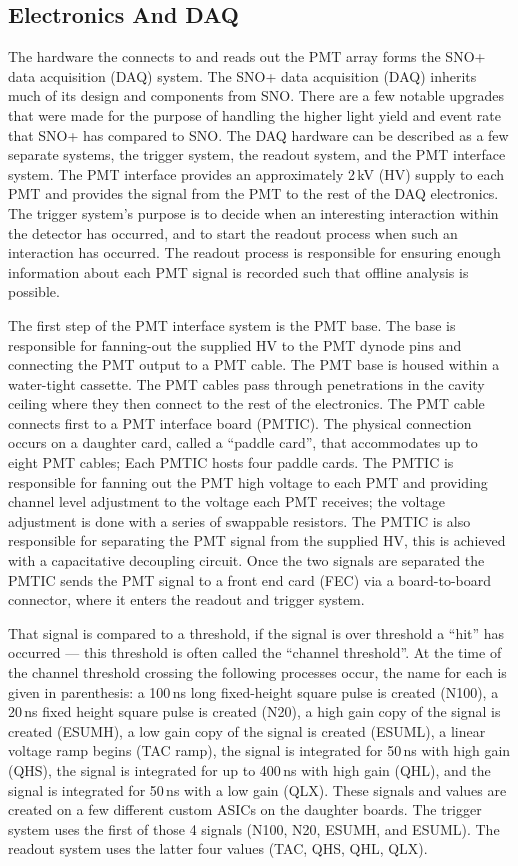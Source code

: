 \subsection{Electronics And DAQ}
The hardware the connects to and reads out the PMT array forms the SNO+ data acquisition (DAQ)
system\@.
The SNO+ data acquisition (DAQ) inherits much of its design and components from
SNO\@.
There are a few notable upgrades that were made for the purpose of handling the
higher light yield and event rate that SNO+ has compared to SNO\@.
The DAQ hardware can be described as a few separate systems, the trigger system,
the readout system, and the PMT interface system.
The PMT interface provides an approximately 2\,kV (HV) supply to each PMT and provides
the signal from the PMT to the rest of the DAQ electronics.
The trigger system's purpose is to decide when an interesting interaction
within the detector has occurred, and to start the readout process when such an
interaction has occurred.
The readout process is responsible for ensuring enough information about each
PMT signal is recorded such that offline analysis is possible.

The first step of the PMT interface system is the PMT base. The base is responsible
for fanning-out the supplied HV to the PMT dynode pins and connecting the PMT output
to a PMT cable. The PMT base is housed within a water-tight cassette.
The PMT cables pass through penetrations in the cavity ceiling where they then connect
to the rest of the electronics. The PMT cable connects first to a PMT interface
board (PMTIC). The physical connection occurs on a daughter card, called a ``paddle card'',
that accommodates up to eight PMT cables; Each PMTIC hosts four paddle cards.
The PMTIC is responsible for fanning out the PMT high voltage
to each PMT and providing channel level adjustment to the voltage
each PMT receives; the voltage adjustment is done with a series of
swappable resistors.
The PMTIC is also responsible for separating the PMT signal from the supplied
HV, this is achieved with a capacitative decoupling circuit.
Once the two signals are separated the PMTIC sends the PMT signal to
a front end card (FEC) via a board-to-board connector, where it enters
the readout and trigger system.

That signal is compared to a threshold, if the signal is over threshold a ``hit''
has occurred --- this threshold is often called the ``channel threshold''.
At the time of the channel threshold crossing the following processes occur, the name for each is given
in parenthesis:
a 100\,ns long fixed-height square pulse is created (N100), a 20\,ns fixed height square pulse is created (N20),
a high gain copy of the signal is created (ESUMH), a low gain copy of the signal
is created (ESUML), a linear voltage ramp begins (TAC ramp), the signal is integrated for
50\,ns with high gain (QHS), the signal is integrated for up to 400\,ns with high gain (QHL),
and the signal is integrated for 50\,ns with a low gain (QLX).
These signals and values are created on a few different custom ASICs on the
daughter boards.
The trigger system uses the first of those 4 signals (N100, N20, ESUMH, and ESUML).
The readout system uses the latter four values (TAC, QHS, QHL, QLX).


